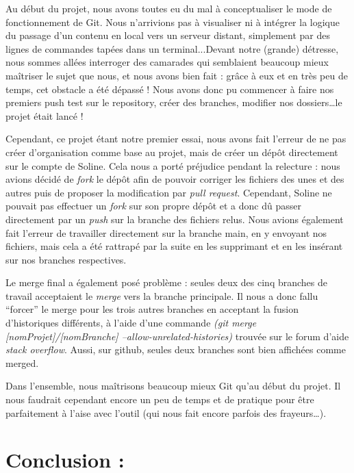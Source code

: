 \documentclass{article}
\begin{document}
Au début du projet, nous avons toutes eu du mal à conceptualiser le mode de fonctionnement de Git. Nous n’arrivions pas à visualiser ni à intégrer la logique du passage d’un contenu en local vers un serveur distant, simplement par des lignes de commandes tapées dans un terminal...Devant notre (grande) détresse, nous sommes allées interroger des camarades qui semblaient beaucoup mieux maîtriser le sujet que nous, et nous avons bien fait : grâce à eux et en très peu de temps, cet obstacle a été dépassé ! Nous avons donc pu commencer à faire nos premiers push test sur le repository, créer des branches, modifier nos dossiers…le projet était lancé !


Cependant, ce projet étant notre premier essai, nous avons fait l’erreur de ne pas créer d’organisation comme base au projet, mais de créer un dépôt directement sur le compte de Soline. Cela nous a porté préjudice pendant la relecture : nous avions décidé de \textit{fork} le dépôt afin de pouvoir corriger les fichiers des unes et des autres puis de proposer la modification par \textit{pull request}. 
Cependant, Soline ne pouvait pas effectuer un \textit{fork} sur son propre dépôt et a donc dû passer directement par un \textit{push} sur la branche des fichiers relus. Nous avions également fait l’erreur de travailler directement sur la branche main, en y envoyant nos fichiers, mais cela a été rattrapé par la suite en les supprimant et en les insérant sur nos branches respectives.



Le merge final a également posé problème : seules deux des cinq branches de travail acceptaient le \textit{merge} vers la branche principale. Il nous a donc fallu “forcer” le merge pour les trois autres branches en acceptant la fusion d’historiques différents, à l’aide d’une commande \textit{(git merge [nomProjet]/[nomBranche] --allow-unrelated-histories)} trouvée sur le forum d’aide \textit{stack overflow}. Aussi, sur github, seules deux branches sont bien affichées comme merged.
  

Dans l’ensemble, nous maîtrisons beaucoup mieux Git qu’au début du projet. Il nous faudrait cependant encore un peu de temps et de pratique pour être parfaitement à l’aise avec l’outil (qui nous fait encore parfois des frayeurs…).



\section*{Conclusion :}
\end{document}
